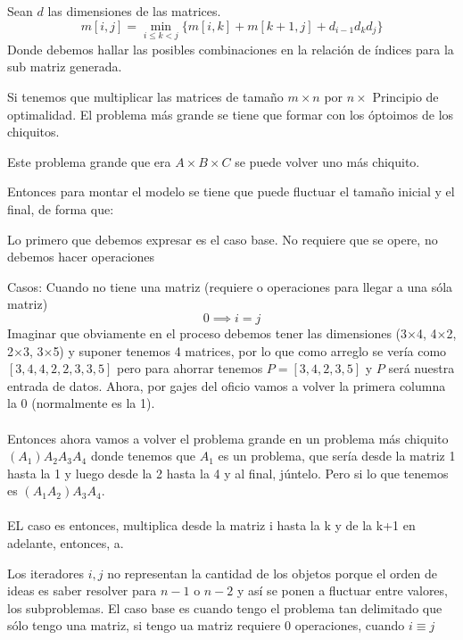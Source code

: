 \begin{theorem}
	Sean $d$ las dimensiones de las matrices.
	$$ m[i,j]=\min_{i\le k<j}\{m[i,k]+m[k+1,j]+d_{i-1}d_kd_j \} $$
	Donde debemos hallar las posibles combinaciones en la relación de índices para la sub matriz generada.
\end{theorem}

\begin{example}
	Si tenemos que multiplicar las matrices de tamaño $m\times n$ por $n\times$
	Principio de optimalidad. El problema más grande se tiene que formar con los óptoimos de los chiquitos.
\end{example}

\begin{fact}
	Este problema grande que era $A\times B\times C$ se puede volver uno más chiquito.

	Entonces para montar el modelo se tiene que puede fluctuar el tamaño inicial y el final, de forma que:

	Lo primero que debemos expresar es el caso base. No requiere que se opere, no debemos hacer operaciones

	Casos:
	Cuando no tiene una matriz (requiere o operaciones para llegar a una sóla matriz)
	$$
		0\implies i=j
	$$
	Imaginar que obviamente en el proceso debemos tener las dimensiones (3$\times$4, 4$\times$2, 2$\times$3, 3$\times$5) y suponer tenemos 4 matrices, por lo que como arreglo se vería como $[3,4,4,2,2,3,3,5]$ pero para ahorrar tenemos $P=[3,4,2,3,5]$ y $P$ será nuestra entrada de datos. Ahora, por gajes del oficio vamos a volver la primera columna la 0 (normalmente es la 1).
	\\~\\
	Entonces ahora vamos a volver el problema grande en un problema más chiquito $(A_1) A_2 A_3 A_4$ donde tenemos que $A_1$ es un problema, que sería desde la matriz 1 hasta la 1 y luego desde la 2 hasta la 4 y al final, júntelo.
	Pero si lo que tenemos es $(A_1 A_2) A_3 A_4$.
	\\~\\
	EL caso es entonces, multiplica desde la matriz i hasta la k y de la k+1 en adelante, entonces, a.
\end{fact}

Los iteradores $i,j$ no representan la cantidad de los objetos porque el orden de ideas es saber resolver para $n-1$ o $n-2$ y así se ponen a fluctuar entre valores, los subproblemas.
El caso base es cuando tengo el problema tan delimitado que sólo tengo una matriz, si tengo ua matriz requiere 0 operaciones, cuando $i\equiv j$

